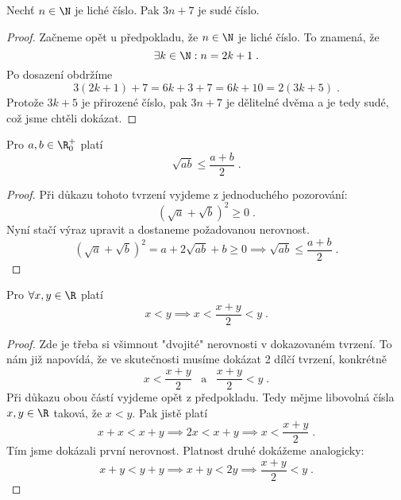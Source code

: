 \begin{assertion}
    Nechť $n\in\N$ je liché číslo. Pak $3n+7$ je sudé číslo.
\end{assertion}
\begin{proof}
    Začneme opět u předpokladu, že $n\in\N$ je liché číslo. To znamená, že
    \begin{equation*}
        \exists k\in\N : n=2k+1\; .
    \end{equation*}
    Po dosazení obdržíme
    \begin{equation*}
        3(2k+1)+7=6k+3+7=6k+10=2(3k+5)\; .
    \end{equation*}
    Protože $3k+5$ je přirozené číslo, pak $3n+7$ je dělitelné dvěma a je tedy sudé, což jsme chtěli dokázat.
\end{proof}
\begin{assertion}[AG nerovnost]
    Pro $a,b\in\R_0^+$ platí
    \begin{equation*}
        \sqrt{ab}\leq\dfrac{a+b}{2}\; .
    \end{equation*}
\end{assertion}
\begin{proof}
    Při důkazu tohoto tvrzení vyjdeme z jednoduchého pozorování:
    \begin{equation*}
        (\sqrt{a}+\sqrt{b})^2\geq 0\; .
    \end{equation*}
    Nyní stačí výraz upravit a dostaneme požadovanou nerovnost.
    \begin{equation*}
        (\sqrt{a}+\sqrt{b})^2 = a+2\sqrt{ab}+b\geq 0 \implies \sqrt{ab}\leq \dfrac{a+b}{2}\; .
    \end{equation*}
\end{proof}
\begin{assertion}
    Pro $\forall x,y\in\R$ platí
    \begin{equation*}
        x<y \implies x < \dfrac{x+y}{2} < y\; .
    \end{equation*}
\end{assertion}
\begin{proof}
    Zde je třeba si všimnout "dvojité" nerovnosti v dokazovaném tvrzení. To nám již napovídá, že ve skutečnosti musíme dokázat 2 dílčí tvrzení, konkrétně
    \begin{equation*}
        x < \dfrac{x+y}{2}\;\;\;\text{a}\;\;\;\dfrac{x+y}{2} < y\; .
    \end{equation*}
    Při důkazu obou částí vyjdeme opět z předpokladu. Tedy mějme libovolná čísla $x,y\in\R$ taková, že $x<y$. Pak jistě platí
    \begin{equation*}
        x+x<x+y \implies 2x<x+y \implies x<\dfrac{x+y}{2}\; .
    \end{equation*}
    Tím jsme dokázali první nerovnost. Platnost druhé dokážeme analogicky:
    \begin{equation*}
        x+y<y+y \implies x+y<2y \implies \dfrac{x+y}{2}<y\; .
    \end{equation*}
\end{proof}
